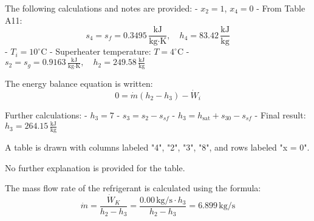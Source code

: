 The following calculations and notes are provided:  
- \( x_2 = 1 \), \( x_4 = 0 \)  
- From Table A11:  
  \[
  s_4 = s_f = 0.3495 \, \frac{\text{kJ}}{\text{kg·K}}, \quad h_4 = 83.42 \, \frac{\text{kJ}}{\text{kg}}
  \]  
- \( T_i = 10^\circ \text{C} \)  
- Superheater temperature: \( T = 4^\circ \text{C} \)  
- \( s_2 = s_g = 0.9163 \, \frac{\text{kJ}}{\text{kg·K}}, \quad h_2 = 249.58 \, \frac{\text{kJ}}{\text{kg}} \)  

The energy balance equation is written:  
\[
0 = \dot{m} \left( h_2 - h_3 \right) - \dot{W}_i
\]  

Further calculations:  
- \( h_3 = 7 \)  
- \( s_3 = s_2 - s_{sf} \)  
- \( h_3 = h_{\text{sat}} + s_{30} - s_{sf} \)  
- Final result: \( h_3 = 264.15 \, \frac{\text{kJ}}{\text{kg}} \)  

A table is drawn with columns labeled "4", "2", "3", "8", and rows labeled "x = 0".  

No further explanation is provided for the table.

The mass flow rate of the refrigerant is calculated using the formula:  
\[
\dot{m} = \frac{\dot{W}_K}{h_2 - h_3} = \frac{0.00 \, \text{kg/s} \cdot h_3}{h_2 - h_3} = 6.899 \, \text{kg/s}
\]